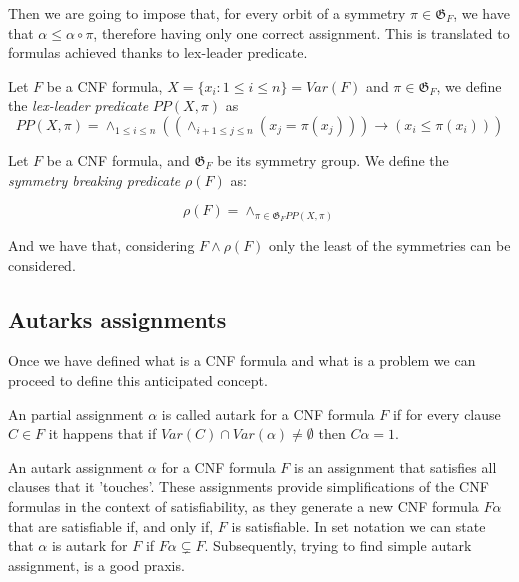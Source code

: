 Then we are going to impose that, for every orbit of a symmetry $\pi \in \mathfrak{G}_F$, we have that $\alpha\le \alpha\circ\pi$, therefore having only one correct assignment. This is translated to formulas achieved thanks to lex-leader predicate.


\begin{definition}

  Let $F$ be a CNF formula, $X=\{x_i: 1\le i \le n\}=Var(F)$ and $\pi \in \mathfrak{G}_F$, we define the \emph{lex-leader predicate} $PP(X,\pi)$ as
  $$PP(X,\pi) = \land_{1\le i \le n} \left (\left (
    \land_{i+1 \le j \le n} (x_j = \pi(x_j)) \right )  \to (x_i \le \pi(x_i) )\right )$$
\end{definition}


\begin{definition}

  Let $F$ be a CNF formula, and $\mathfrak{G}_F$ be its symmetry group. We define the \emph{symmetry breaking predicate} $\rho(F)$ as:

  $$ \rho(F)  = \land_{\pi \in \mathfrak{G}_F PP(X,\pi)}$$

\end{definition}


And we have that, considering $F\land \rho(F)$ only the least of the symmetries can be considered. 

\subsection{Autarks assignments}
\label{sec:autark}

Once we have defined what is a CNF formula and what is a problem we can proceed to define this anticipated concept.

\begin{definition}
  An partial assignment $\alpha$ is called autark for a CNF formula $F$ if for every clause $C \in F$ it happens that if $Var(C) \cap Var(\alpha) \ne \emptyset $ then $C\alpha = 1$.
\end{definition}

An autark assignment $\alpha$  for a CNF formula $F$ is an assignment that satisfies all clauses that it 'touches'. These assignments provide simplifications of the CNF formulas in the context of satisfiability, as they generate a new CNF formula $F\alpha$ that are satisfiable if, and only if,  $F$ is satisfiable. In set notation we can state that $\alpha$ is autark for $F$ if $F\alpha \subsetneq F$. Subsequently, trying to find simple autark assignment, is a good praxis.\\


